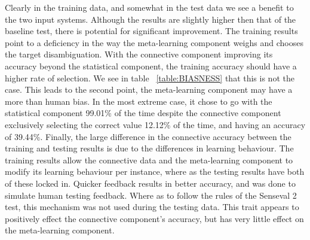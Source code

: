 Clearly in the training data, and somewhat in the test data we see a benefit to the two input systems. Although the results are slightly higher then that of the baseline test, there is potential for significant improvement.  The training results point to a deficiency in the way the meta-learning component weighs and chooses the target disambiguation.  With the connective component improving its accuracy beyond the statistical component, the training accuracy should have a higher rate of selection. We see in table ~\ref{table:BIASNESS} that this is not the case. This leads to the second point, the meta-learning component may have a more than human bias.  In the most extreme case, it chose to go with the statistical component 99.01\% of the time despite the connective component exclusively selecting the correct value 12.12\% of the time, and having an accuracy of 39.44\%. Finally, the large difference in the connective accuracy between the training and testing results is due to the differences in learning behaviour.  The training results allow the connective data and the meta-learning component to modify its learning behaviour per instance, where as the testing results have both of these locked in.  Quicker feedback results in better accuracy, and was done to simulate human testing feedback. Where as to follow the rules of the Senseval 2 test, this mechanism was not used during the testing data.  This trait appears to positively effect the connective component's accuracy, but has very little effect on the meta-learning component.


